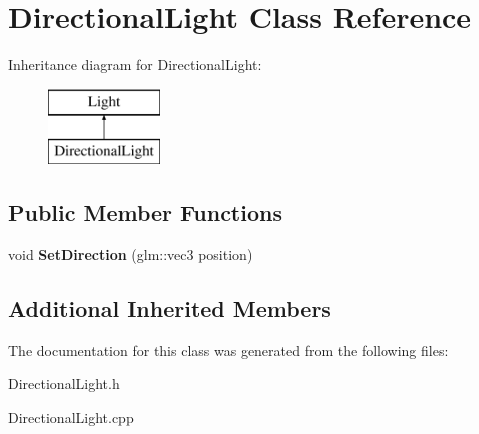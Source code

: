 \hypertarget{class_directional_light}{}\section{Directional\+Light Class Reference}
\label{class_directional_light}
Inheritance diagram for Directional\+Light\+:\begin{figure}[H]
\begin{center}
\leavevmode
\includegraphics[height=2.000000cm]{class_directional_light}
\end{center}
\end{figure}
\subsection*{Public Member Functions}
\begin{DoxyCompactItemize}
\item 
\mbox{\label{class_directional_light_afdd5ff26965bdc32a0254af59332afd5}} 
void {\bfseries Set\+Direction} (glm\+::vec3 position)
\end{DoxyCompactItemize}
\subsection*{Additional Inherited Members}


The documentation for this class was generated from the following files\+:\begin{DoxyCompactItemize}
\item 
Directional\+Light.\+h\item 
Directional\+Light.\+cpp\end{DoxyCompactItemize}
